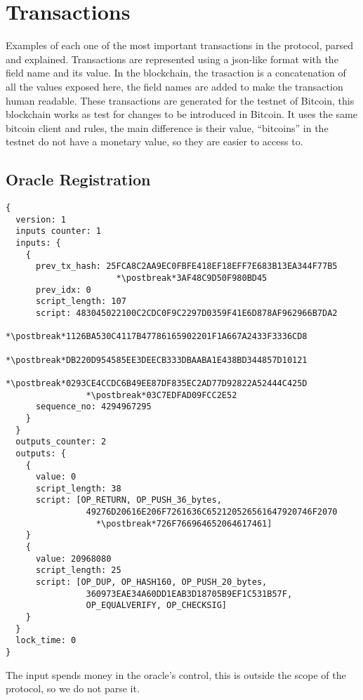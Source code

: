 \section{Transactions}
Examples of each one of the most important transactions in the protocol,
  parsed and explained.
Transactions are represented using a json-like format with the field name
  and its value.
In the blockchain, the trasaction is a concatenation of all the values
  exposed here, the field names are added to make the transaction human
  readable.
These transactions are generated for the testnet of Bitcoin, this blockchain
  works as test for changes to be introduced in Bitcoin.
It uses the same bitcoin client and rules, the main difference is their value,
  ``bitcoins'' in the testnet do not have a monetary value, so they are easier
  to access to.

\lstset{%
  basicstyle=\ttfamily,
  columns=fullflexible,
  tabsize=2,
  linewidth=10cm,
  escapechar=*,
}
\newcommand{\postbreak}[0]{\mbox{\textcolor{red}{$\hookrightarrow$}\space}}
\subsection{Oracle Registration}
\begin{lstlisting}
{
  version: 1
  inputs counter: 1
  inputs: {
    {
      prev_tx_hash: 25FCA8C2AA9EC0FBFE418EF18EFF7E683B13EA344F77B5
                      *\postbreak*3AF48C9D50F980BD45
      prev_idx: 0
      script_length: 107
      script: 483045022100C2CDC0F9C2297D0359F41E6D878AF962966B7DA2
                *\postbreak*1126BA530C4117B47786165902201F1A667A2433F3336CD8
                *\postbreak*DB220D954585EE3DEECB333DBAABA1E438BD344857D10121
                *\postbreak*0293CE4CCDC6B49EE87DF835EC2AD77D92822A52444C425D
                *\postbreak*03C7EDFAD09FCC2E52
      sequence_no: 4294967295
    }
  }
  outputs_counter: 2
  outputs: {
    {
      value: 0
      script_length: 38
      script: [OP_RETURN, OP_PUSH_36_bytes,
                49276D20616E206F7261636C652120526561647920746F2070
                  *\postbreak*726F766964652064617461]
    }
    {
      value: 20968080
      script_length: 25
      script: [OP_DUP, OP_HASH160, OP_PUSH_20_bytes,
                360973EAE34A60DD1EAB3D18705B9EF1C531B57F,
                OP_EQUALVERIFY, OP_CHECKSIG]
    }
  }
  lock_time: 0
}
\end{lstlisting}

The input spends money in the oracle's control, this is outside the scope
  of the protocol, so we do not parse it.


